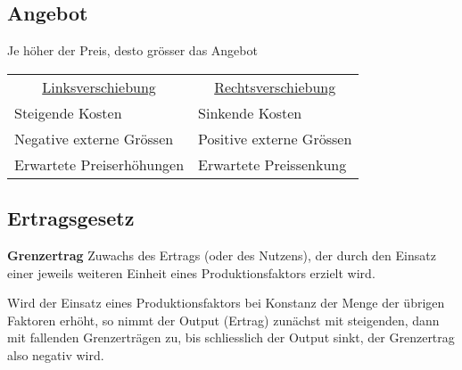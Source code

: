 \subsection{Angebot}
Je höher der Preis, desto grösser das Angebot
\begin{center}
\end{center}

 \begin{tabular}{@{}p{}%
				@{}p{}}
	\multicolumn{1}{c}{\underline{Linksverschiebung}} & \multicolumn{1}{c}{\underline{Rechtsverschiebung}}\\
	Steigende Kosten & Sinkende Kosten \\
	Negative externe Grössen & Positive externe Grössen \\
	Erwartete Preiserhöhungen & Erwartete Preissenkung \\
\end{tabular}

\subsection{Ertragsgesetz}
\textbf{Grenzertrag} Zuwachs des Ertrags (oder des Nutzens), der durch den Einsatz 
einer jeweils weiteren Einheit eines Produktionsfaktors erzielt wird.

Wird der Einsatz eines Produktionsfaktors bei Konstanz der Menge der übrigen Faktoren erhöht,
so nimmt der Output (Ertrag) zunächst mit steigenden, dann mit fallenden Grenzerträgen zu, bis
schliesslich der Output sinkt, der Grenzertrag also negativ wird.





